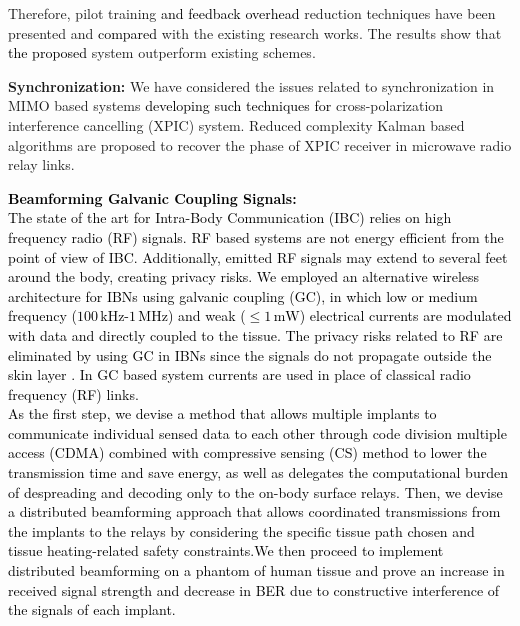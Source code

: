 \begin{enumerate}
     Therefore, pilot training \textcolor{black}{and feedback overhead} reduction techniques have been presented and \textcolor{black}{compared} with the existing research works. The results show that \textcolor{black}{the proposed} system outperform existing schemes.
 \item \textbf{Synchronization:} We have considered the issues related to synchronization in MIMO based systems \textcolor{black}{developing such techniques for } cross-polarization interference cancelling (XPIC) system. Reduced complexity Kalman based algorithms are proposed to recover the phase of XPIC receiver in microwave radio relay links.
 \textcolor{black}{\item \textbf{Beamforming Galvanic Coupling Signals:}\\
 The state of the art for Intra-Body Communication (IBC) relies on high frequency radio (RF) signals. RF based systems are not energy efficient \textcolor{black}{from the point of view of } IBC. Additionally, emitted RF signals may extend to several feet around the body, creating privacy risks. We employed an alternative wireless architecture for IBNs using galvanic coupling (GC), in which low or medium frequency ($100\,\mathrm{kHz}$-$1\,\mathrm{MHz}$) and weak ($\leq 1\,\mathrm{mW}$) electrical currents are modulated with data and directly coupled to the tissue. The privacy risks related to RF are eliminated by using GC in IBNs since the signals do not propagate outside the skin layer \cite{teshome}. In GC based system currents are used in place of classical radio frequency (RF) links.\\
 As the first step, we devise a
method that allows multiple implants to communicate individual
sensed data to each other through code division multiple access (CDMA) combined with compressive sensing (CS) method to
lower the transmission time and save energy, as well as delegates
the computational burden of despreading and decoding only
to the on-body surface relays. Then, we devise a distributed
beamforming approach that allows coordinated transmissions
from the implants to the relays by considering the specific tissue
path chosen and tissue heating-related safety constraints.We then
proceed to implement distributed beamforming on a phantom of
human tissue and prove an increase in received signal strength
and decrease in BER due to constructive interference of the
signals of each implant.}
\end{enumerate}

